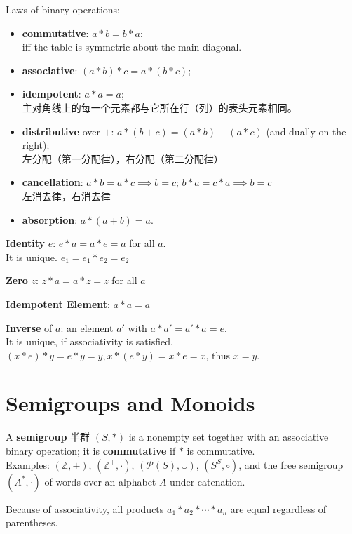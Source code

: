 \documentclass[12pt, a4paper, UTF8, openany]{ctexbook}
\newcommand{\field}[1]{\mathbb{#1}}%
\begin{document}
        Laws of binary operations:
        \begin{itemize}
            \item \textbf{commutative}: $a * b = b * a$; \\
                iff the table is symmetric about the main diagonal.
            \item \textbf{associative}: $(a * b) * c = a * (b * c)$;
            \item \textbf{idempotent}: $a * a = a$; \\
                主对角线上的每一个元素都与它所在行（列）的表头元素相同。
            \item \textbf{distributive} over $+$: $a * (b + c) = (a * b) + (a * c)$ (and dually on the right); \\
                左分配（第一分配律），右分配（第二分配律）
            \item \textbf{cancellation}: $a * b = a * c \implies b = c$; $b * a = c * a \implies b = c$ \\
                左消去律，右消去律
            \item \textbf{absorption}: $a * (a + b) = a$.
        \end{itemize}

        \textbf{Identity} $e$: $e * a = a * e = a$ for all $a$. \\
        It is unique. $e_1 = e_1 * e_2 = e_2$

        \textbf{Zero} $z$: $z * a = a * z = z$ for all $a$

        \textbf{Idempotent Element}: $a * a = a$

        \textbf{Inverse} of $a$: an element $a'$ with $a * a' = a' * a = e$. \\
        It is unique, if associativity is satisfied. $(x * e) * y = e * y = y, x * (e * y) = x * e = x$, thus $x = y$.

    \section{Semigroups and Monoids}
        A \textbf{semigroup} 半群 $(S, *)$ is a nonempty set together with an associative binary operation; it is \textbf{commutative} if $*$ is commutative. \\
        Examples: $(\field{Z}, +)$, $(\field{Z}^+, \cdot)$, $(\mathcal{P}(S), \cup)$, $(S^S, \circ)$, and the free semigroup $(A^*, \cdot)$ of words over an alphabet $A$ under catenation.

        Because of associativity, all products $a_1 * a_2 * \cdots * a_n$ are equal regardless of parentheses.
\end{document}
